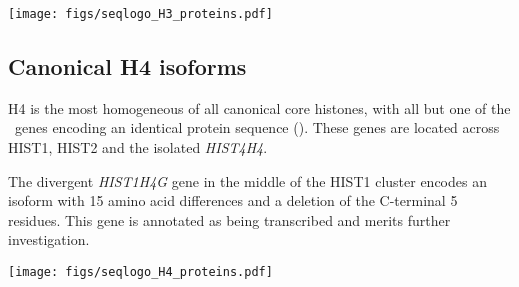     \begin{table}
      \caption{%
        Canonical H3 encoded protein isoforms.
        Upper panel shows isoform variations relative to the most numerous protein isoform
        using HGVS recommended nomenclature \citep{mutnomenclature2003}.
        Lower panel shows sequence logo of all isoforms aligned
        with invariant residues in grey.
      }
      \label{tab:H3-consensus}
      
      \texttt{[image: figs/seqlogo\_H3\_proteins.pdf]}
    \end{table}

  \subsection{Canonical H4 isoforms}
    H4 is the most homogeneous of all canonical core histones,
    with all but one of the \HFourCodingGenes{}~genes encoding
    an identical protein sequence ().
    These genes are located across HIST1, HIST2 and the isolated
    \textit{HIST4H4}.

    The divergent \textit{HIST1H4G} gene in the middle of the HIST1 cluster
    encodes an isoform with 15 amino acid differences and a deletion of the C-terminal 5 residues.
    This gene is annotated as being transcribed and merits further investigation.

    \begin{table}
      \caption{%
        Canonical H4 encoded protein isoforms.
        Upper panel shows isoform variations relative to the most numerous protein isoform
        using HGVS recommended nomenclature \citep{mutnomenclature2003}.
        Lower panel shows sequence logo of all isoforms aligned
        with invariant residues in grey.
      }
      \label{tab:H4-consensus}
      
      \texttt{[image: figs/seqlogo\_H4\_proteins.pdf]}
    \end{table}
